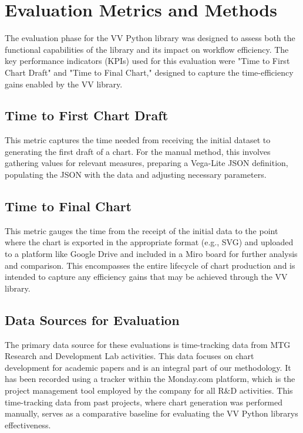 \section{Evaluation Metrics and
Methods}\label{evaluation-metrics-and-methods}

The evaluation phase for the VV Python library was designed to assess
both the functional capabilities of the library and its impact on
workflow efficiency. The key performance indicators (KPIs) used for this
evaluation were "Time to First Chart Draft" and "Time to Final Chart,"
designed to capture the time-efficiency gains enabled by the VV library.

\subsection{Time to First Chart
Draft}\label{time-to-first-chart-draft}

This metric captures the time needed from receiving the initial dataset
to generating the first draft of a chart. For the manual method, this
involves gathering values for relevant measures, preparing a Vega-Lite
JSON definition, populating the JSON with the data and adjusting
necessary parameters.

\subsection{Time to Final Chart}\label{time-to-final-chart}

This metric gauges the time from the receipt of the initial data to the
point where the chart is exported in the appropriate format (e.g., SVG)
and uploaded to a platform like Google Drive and included in a Miro
board for further analysis and comparison. This encompasses the entire
lifecycle of chart production and is intended to capture any efficiency
gains that may be achieved through the VV library.

\subsection{Data Sources for
Evaluation}\label{data-sources-for-evaluation}

The primary data source for these evaluations is time-tracking data from
MTG Research and Development Lab activities. This data focuses on chart
development for academic papers and is an integral part of our
methodology. It has been recorded using a tracker within the Monday.com
platform, which is the project management tool employed by the company
for all R\&D activities. This time-tracking data from past projects,
where chart generation was performed manually, serves as a comparative
baseline for evaluating the VV Python library\textquotesingle s
effectiveness.

